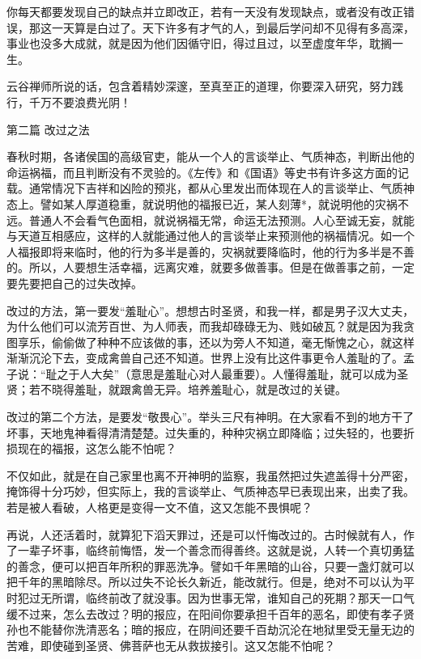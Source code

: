 \documentclass[12pt,UTF8]{ctexbook}
\begin{document}
你每天都要发现自己的缺点并立即改正，若有一天没有发现缺点，或者没有改正错误，那这一天算是白过了。天下许多有才气的人，到最后学问却不见得有多高深，事业也没多大成就，就是因为他们因循守旧，得过且过，以至虚度年华，耽搁一生。

云谷禅师所说的话，包含着精妙深邃，至真至正的道理，你要深入研究，努力践行，千万不要浪费光阴！


第二篇 改过之法

春秋时期，各诸侯国的高级官吏，能从一个人的言谈举止、气质神态，判断出他的命运祸福，而且判断没有不灵验的。《左传》和《国语》等史书有许多这方面的记载。通常情况下吉祥和凶险的预兆，都从心里发出而体现在人的言谈举止、气质神态上。譬如某人厚道稳重，就说明他的福报已近，某人刻薄*，就说明他的灾祸不远。普通人不会看气色面相，就说祸福无常，命运无法预测。人心至诚无妄，就能与天道互相感应，这样的人就能通过他人的言谈举止来预测他的祸福情况。如一个人福报即将来临时，他的行为多半是善的，灾祸就要降临时，他的行为多半是不善的。所以，人要想生活幸福，远离灾难，就要多做善事。但是在做善事之前，一定要先要把自己的过失改掉。

改过的方法，第一要发“羞耻心”。想想古时圣贤，和我一样，都是男子汉大丈夫，为什么他们可以流芳百世、为人师表，而我却碌碌无为、贱如破瓦？就是因为我贪图享乐，偷偷做了种种不应该做的事，还以为旁人不知道，毫无惭愧之心，就这样渐渐沉沦下去，变成禽兽自己还不知道。世界上没有比这件事更令人羞耻的了。孟子说：“耻之于人大矣”（意思是羞耻心对人最重要）。人懂得羞耻，就可以成为圣贤；若不晓得羞耻，就跟禽兽无异。培养羞耻心，就是改过的关键。

改过的第二个方法，是要发“敬畏心”。举头三尺有神明。在大家看不到的地方干了坏事，天地鬼神看得清清楚楚。过失重的，种种灾祸立即降临；过失轻的，也要折损现在的福报，这怎么能不怕呢？

不仅如此，就是在自己家里也离不开神明的监察，我虽然把过失遮盖得十分严密，掩饰得十分巧妙，但实际上，我的言谈举止、气质神态早已表现出来，出卖了我。若是被人看破，人格更是变得一文不值，这又怎能不畏惧呢？

再说，人还活着时，就算犯下滔天罪过，还是可以忏悔改过的。古时候就有人，作了一辈子坏事，临终前悔悟，发一个善念而得善终。这就是说，人转一个真切勇猛的善念，便可以把百年所积的罪恶洗净。譬如千年黑暗的山谷，只要一盏灯就可以把千年的黑暗除尽。所以过失不论长久新近，能改就行。但是，绝对不可以认为平时犯过无所谓，临终前改了就没事。因为世事无常，谁知自己的死期？那天一口气缓不过来，怎么去改过？明的报应，在阳间你要承担千百年的恶名，即使有孝子贤孙也不能替你洗清恶名；暗的报应，在阴间还要千百劫沉沦在地狱里受无量无边的苦难，即使碰到圣贤、佛菩萨也无从救拔接引。这又怎能不怕呢？
\end{document}
